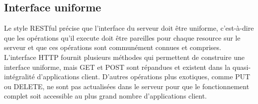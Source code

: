 \documentclass{article}
\begin{document}
\subsection{Interface uniforme}
Le style RESTful précise que l'interface du serveur doit être uniforme, c'est-à-dire que les opérations qu'il execute doit être pareilles pour chaque resource sur le serveur et que ces opérations sont communément connues et comprises. L'interface HTTP fournit plusieurs méthodes qui permettent de construire une interface uniforme, mais GET et POST sont répandues et existent dans la quasi-intégralité d'applications client. D'autres opérations plus exotiques, comme PUT ou DELETE, ne sont pas actualisées dans le serveur pour que le fonctionnement complet soit accessible au plus grand nombre d'applications client.
\end{document}
